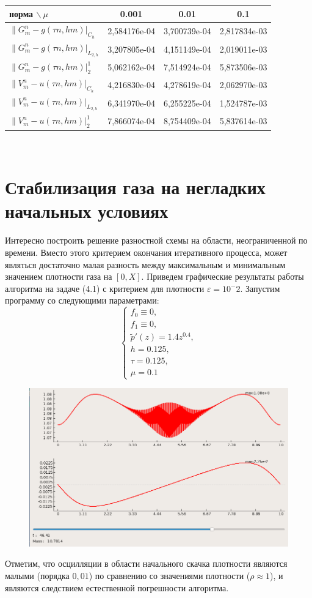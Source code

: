\documentclass[a4paper, 11pt]{article}
\begin{document}
\begin{tabular}{|l|c|c|c|}
\hline
норма $\backslash \ \mu$ 					& 0.001      & 0.01       & 0.1 \\
\hline
$\|G_m^n - g (\tau n, hm)|_{C_h}$ 			& 2,584176e-04 & 3,700739e-04 & 2,817834e-03 \\
\hline
$\|G_m^n - g (\tau n, hm)|_{L_{2,h}}$ 		& 3,207805e-04 & 4,151149e-04 & 2,019011e-03 \\
\hline
$\|G_m^n - g (\tau n, hm)|_2^1$ 			& 5,062162e-04 & 7,514924e-04 & 5,873506e-03 \\
\hline
$\|V_m^n - u (\tau n, hm)|_{C_h}$ 			& 4,216830e-04 & 4,278619e-04 & 2,062970e-03 \\
\hline
$\|V_m^n - u (\tau n, hm)|_{L_{2,h}}$ 		& 6,341970e-04 & 6,255225e-04 & 1,524787e-03 \\
\hline
$\|V_m^n - u (\tau n, hm)|_2^1$ 			& 7,866074e-04 & 8,754409e-04 & 5,837614e-03 \\
\hline
\end{tabular}\\

\section{Стабилизация газа на негладких начальных условиях}
Интересно построить решение разностной схемы на области, неограниченной по времени. Вместо этого критерием окончания итеративного процесса, может являться достаточно малая разность между максимальным и минимальным значением плотности газа на $[0, X]$. Приведем графические результаты работы алгоритма на задаче (4.1) с критерием для плотности $\varepsilon = 10^-2$.
Запустим программу со следующими параметрами:
$$
\begin{cases}
 f_0 \equiv  0, \\
 f_1  \equiv 0, \\
 \tilde{p}'(z) = 1.4z^{0.4}, \\
 h = 0.125, \\
 \tau = 0.125, \\
 \mu = 0.1
\end{cases}
$$
\begin{figure}[H]
	\includegraphics[width=1\linewidth]{p3/p3_rho_t=46,41.png}
\end{figure}
Отметим, что осцилляции в области начального скачка плотности являются малыми (порядка $0,01$) по сравнению со значениями плотности ($\rho \approx 1$), и являются следствием естественной погрешности алгоритма.
\end{document}
